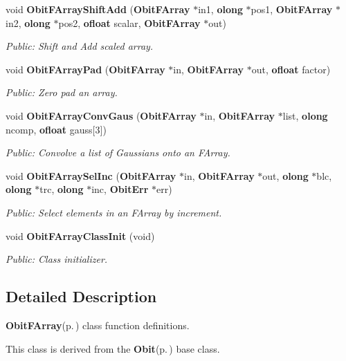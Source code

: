 \begin{CompactItemize}
void {\bf Obit\-FArray\-Shift\-Add} ({\bf Obit\-FArray} $\ast$in1, {\bf olong} $\ast$pos1, {\bf Obit\-FArray} $\ast$in2, {\bf olong} $\ast$pos2, {\bf ofloat} scalar, {\bf Obit\-FArray} $\ast$out)
\begin{CompactList}\small\item\em Public: Shift and Add scaled array. \item\end{CompactList}\item 
void {\bf Obit\-FArray\-Pad} ({\bf Obit\-FArray} $\ast$in, {\bf Obit\-FArray} $\ast$out, {\bf ofloat} factor)
\begin{CompactList}\small\item\em Public: Zero pad an array. \item\end{CompactList}\item 
void {\bf Obit\-FArray\-Conv\-Gaus} ({\bf Obit\-FArray} $\ast$in, {\bf Obit\-FArray} $\ast$list, {\bf olong} ncomp, {\bf ofloat} gauss[3])
\begin{CompactList}\small\item\em Public: Convolve a list of Gaussians onto an FArray. \item\end{CompactList}\item 
void {\bf Obit\-FArray\-Sel\-Inc} ({\bf Obit\-FArray} $\ast$in, {\bf Obit\-FArray} $\ast$out, {\bf olong} $\ast$blc, {\bf olong} $\ast$trc, {\bf olong} $\ast$inc, {\bf Obit\-Err} $\ast$err)
\begin{CompactList}\small\item\em Public: Select elements in an FArray by increment. \item\end{CompactList}\item 
void {\bf Obit\-FArray\-Class\-Init} (void)
\begin{CompactList}\small\item\em Public: Class initializer. \item\end{CompactList}\end{CompactItemize}


\subsection{Detailed Description}
{\bf Obit\-FArray}{\rm (p.\,\pageref{structObitFArray})} class function definitions. 

This class is derived from the {\bf Obit}{\rm (p.\,\pageref{structObit})} base class.

